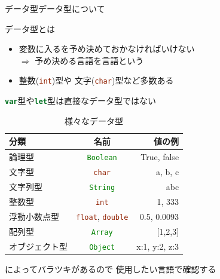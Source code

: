 \documentclass[dvipdfmx]{beamer}
\begin{document}
  \begin{frame}{データ型}{データ型について}
    \begin{large}データ型とは\end{large}
    \begin{itemize}
      \setlength{\itemsep}{2mm}
      \item 変数に入るを予め決めておかなければいけない\\
      $\Longrightarrow$ 予め決める言語を言語という
      \item 整数(\lstinline[language=c]|int|)型や 文字(\lstinline[language=c]|char|)型など多数ある
    \end{itemize}
    \vspace{2mm}
    \textreferencemark \lstinline[language=javascript]|var|型や\lstinline[language=javascript]|let|型は直接なデータ型ではない
    \begin{table}[hbtp]
      \setlength\abovecaptionskip{0pt}
      \caption{様々なデータ型}
      \label{tab:table1}
      \centering
      \footnotesize
      \begin{tabular}{lcr}
        \hline
        分類 & 名前 & 値の例\\
        \hline \hline
        論理型 & \lstinline[language=javascript]|Boolean| & True, false\\
        文字型 & \lstinline[language=c]|char| & a, b, c\\
        文字列型 & \lstinline[language=javascript]|String| & abc \\
        整数型 & \lstinline[language=c]|int| & 1, 333\\
        浮動小数点型 & \lstinline[language=c]|float|, \lstinline[language=c]|double| & 0.5, 0.0093\\
        配列型 & \lstinline[language=javascript]|Array| & [1,2,3]\\
        オブジェクト型 & \lstinline[language=javascript]|Object| & {x:1, y:2, z:3}\\
        \hline
      \end{tabular}
    \end{table}
    \centering
    によってバラツキがあるので 使用したい言語で確認する
    \vspace*{3mm}
  \end{frame}
\end{document}
